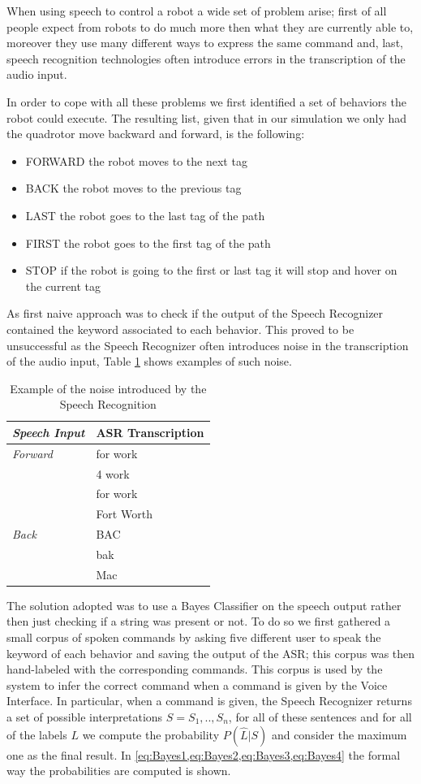 When using speech to control a robot a wide set of problem arise; first of all people expect from robots to do much more then what they are currently able to, moreover they use many different ways to express the same command and, last, speech recognition technologies often introduce errors in the transcription of the audio input.


In order to cope with all these problems we first identified a set of behaviors the robot could execute. The resulting list, given that in our simulation we only had the quadrotor move backward and forward, is the following:
\begin{itemize}
\item FORWARD the robot moves to the next tag
\item BACK the robot moves to the previous tag
\item LAST the robot goes to the last tag of the path
\item FIRST the robot goes to the first tag of the path
\item STOP if the robot is going to the first or last tag it will stop and hover on the current tag
\end{itemize}
As first naive approach was to check if the output of the Speech Recognizer contained the keyword associated to each behavior. This proved to be unsuccessful as the Speech Recognizer often introduces noise in the transcription of the audio input, Table \ref{tab:ASRnoise} shows examples of such noise.

\begin{table}[h]
\centering
	\begin{tabular}{|l|l|}
		\hline
		\emph{Speech Input} & ASR Transcription\\
		\hline
		\emph{Forward} & for work \\
		& 4 work\\
		& for work\\
		& Fort Worth\\
		\hline
		\emph{Back} & BAC\\
		& bak \\
		& Mac \\
		\hline
	\end{tabular}
\caption{Example of the noise introduced by the Speech Recognition}
\label{tab:ASRnoise}
\end{table}

The solution adopted was to use a Bayes Classifier on the speech output rather then just checking if a string was present or not. To do so we first gathered a small corpus of spoken commands by asking five different user to speak the keyword of each behavior and saving the output of the ASR; this corpus was then hand-labeled with the corresponding commands. This corpus is used by the system to infer the correct command when a command is given by the Voice Interface. In particular, when a command is given, the Speech Recognizer returns a set of possible interpretations $S={S_1,..,S_n}$, for all of these sentences and for all of the labels $L$ we compute the probability $P(\hat{L}|S)$ and consider the maximum one as the final result. In \cref{eq:Bayes1,eq:Bayes2,eq:Bayes3,eq:Bayes4} the formal way the probabilities are computed is shown.

